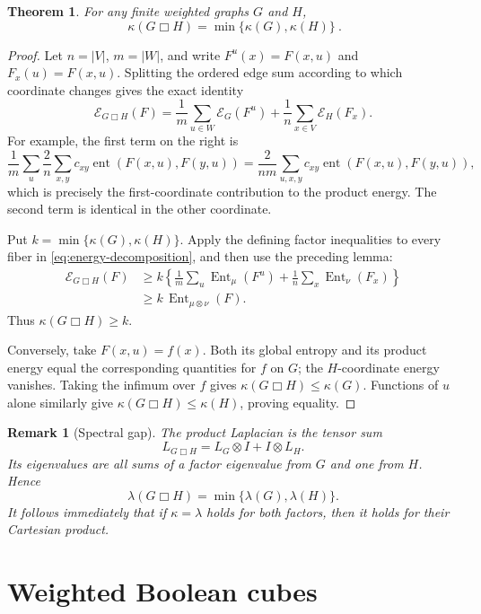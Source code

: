 \documentclass[11pt]{article}
\newtheorem{theorem}{Theorem}
\newtheorem{remark}{Remark}
\newcommand{\Ent}{\operatorname{Ent}}
\newcommand{\EE}{\mathcal E}
\newcommand{\ka}{\kappa}
\newcommand{\la}{\lambda}
\newcommand{\BoxProd}{\mathbin{\Box}}
\begin{document}
\begin{theorem}
For any finite weighted graphs \(G\) and \(H\),
\[
  \boxed{\ \ka(G\BoxProd H)=\min\{\ka(G),\ka(H)\}\ }.
\]
\end{theorem}

\begin{proof}
Let \(n=|V|\), \(m=|W|\), and write \(F^u(x)=F(x,u)\) and
\(F_x(u)=F(x,u)\).  Splitting the ordered edge sum according to which
coordinate changes gives the exact identity
\begin{equation}\label{eq:energy-decomposition}
 \EE_{G\BoxProd H}(F)
 =\frac1m\sum_{u\in W}\EE_G(F^u)
  +\frac1n\sum_{x\in V}\EE_H(F_x).
\end{equation}
For example, the first term on the right is
\[
 \frac1m\sum_u\frac2n\sum_{x,y}c_{xy}
       \operatorname{ent}(F(x,u),F(y,u))
 =\frac{2}{nm}\sum_{u,x,y}c_{xy}
       \operatorname{ent}(F(x,u),F(y,u)),
\]
which is precisely the first-coordinate contribution to the product
energy.  The second term is identical in the other coordinate.

Put \(k=\min\{\ka(G),\ka(H)\}\).  Apply the defining factor inequalities
to every fiber in \eqref{eq:energy-decomposition}, and then use the preceding
lemma:
\begin{align*}
 \EE_{G\BoxProd H}(F)
 &\geq
 k\left\{\frac1m\sum_u\Ent_\mu(F^u)
 +\frac1n\sum_x\Ent_\nu(F_x)\right\}\\
 &\geq k\,\Ent_{\mu\otimes\nu}(F).
\end{align*}
Thus \(\ka(G\BoxProd H)\geq k\).

Conversely, take \(F(x,u)=f(x)\).  Both its global entropy and its product
energy equal the corresponding quantities for \(f\) on \(G\); the
\(H\)-coordinate energy vanishes.  Taking the infimum over \(f\) gives
\(\ka(G\BoxProd H)\leq\ka(G)\).  Functions of \(u\) alone similarly give
\(\ka(G\BoxProd H)\leq\ka(H)\), proving equality.
\end{proof}

\begin{remark}[Spectral gap]
The product Laplacian is the tensor sum
\[
  L_{G\BoxProd H}=L_G\otimes I+I\otimes L_H.
\]
Its eigenvalues are all sums of a factor eigenvalue from \(G\) and one from
\(H\).  Hence
\[
  \la(G\BoxProd H)=\min\{\la(G),\la(H)\}.
\]
It follows immediately that if \(\ka=\la\) holds for both factors, then it
holds for their Cartesian product.
\end{remark}

\section{Weighted Boolean cubes}
\end{document}
